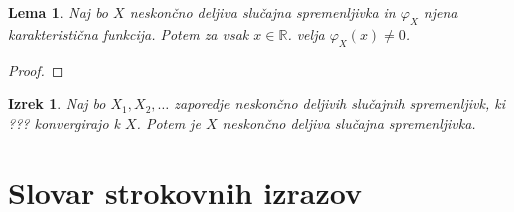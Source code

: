 \documentclass[12pt,a4paper]{amsart}
\theoremstyle{definition} %
\theoremstyle{plain} %
\newtheorem{lema}[definicija]{Lema}
\newtheorem{izrek}[definicija]{Izrek}
\newcommand{\geslo}[2]{\noindent\textbf{#1}\hspace*{3mm}\hangindent=\parindent\hangafter=1 #2}
\begin{document}
    \begin{lema}
        Naj bo $X$ neskončno deljiva slučajna spremenljivka in $\varphi_X$ njena karakteristična funkcija. Potem za vsak $x \in \mathbb{R}$. velja $\varphi_X(x) \neq 0$.
    \end{lema}

    \begin{proof}
        
    \end{proof}

    \begin{izrek}
        Naj bo $X_1, X_2, \dots $ zaporedje neskončno deljivih slučajnih spremenljivk, ki ??? konvergirajo k $X$. Potem je $X$ neskončno
        deljiva slučajna spremenljivka.
    \end{izrek}



\section*{Slovar strokovnih izrazov}

%
%


\begin{thebibliography}{99}


\end{thebibliography}
\end{document}
